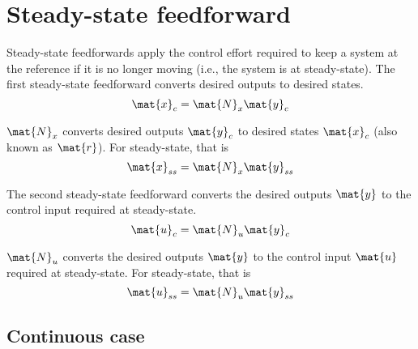 
\chapter{Steady-state feedforward}

Steady-state feedforwards apply the \gls{control effort} required to keep a
\gls{system} at the \gls{reference} if it is no longer moving (i.e., the
\gls{system} is at steady-state). The first steady-state feedforward converts
desired \glspl{output} to desired \glspl{state}.
\begin{equation*}
  \mat{x}_c = \mat{N}_x\mat{y}_c
\end{equation*}

$\mat{N}_x$ converts desired \glspl{output} $\mat{y}_c$ to desired \glspl{state}
$\mat{x}_c$ (also known as $\mat{r}$). For steady-state, that is
\begin{equation}
  \mat{x}_{ss} = \mat{N}_x\mat{y}_{ss} \label{eq:x_ss}
\end{equation}

The second steady-state feedforward converts the desired \glspl{output}
$\mat{y}$ to the \gls{control input} required at steady-state.
\begin{equation*}
  \mat{u}_c = \mat{N}_u\mat{y}_c
\end{equation*}

$\mat{N}_u$ converts the desired \glspl{output} $\mat{y}$ to the
\gls{control input} $\mat{u}$ required at steady-state. For steady-state, that
is
\begin{equation}
  \mat{u}_{ss} = \mat{N}_u\mat{y}_{ss} \label{eq:u_ss}
\end{equation}

\section{Continuous case}

